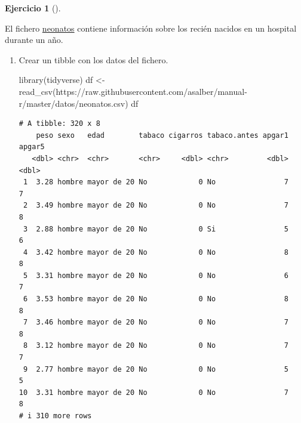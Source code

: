 \documentclass[
  spanish,
  a4paper,
]{scrreport}
\newenvironment{Shaded}{\begin{snugshade}}{\end{snugshade}}
\newcommand{\FunctionTok}[1]{\textcolor[rgb]{0.28,0.35,0.67}{#1}}
\newcommand{\NormalTok}[1]{\textcolor[rgb]{0.00,0.23,0.31}{#1}}
\newcommand{\OtherTok}[1]{\textcolor[rgb]{0.00,0.23,0.31}{#1}}
\newcommand{\StringTok}[1]{\textcolor[rgb]{0.13,0.47,0.30}{#1}}
\theoremstyle{definition}
\newtheorem{exercise}{Ejercicio}[chapter]
\theoremstyle{definition}
\theoremstyle{remark}
\begin{document}
\begin{exercise}[]\protect\hypertarget{exr-graficos-1}{}\label{exr-graficos-1}

El fichero
\href{https://raw.githubusercontent.com/asalber/manual-r/master/datos/neonatos.csv}{neonatos}
contiene información sobre los recién nacidos en un hospital durante un
año.

\begin{enumerate}
\def\labelenumi{\alph{enumi}.}
\item
  Crear un tibble con los datos del fichero.

  \begin{tcolorbox}[enhanced jigsaw, arc=.35mm, bottomrule=.15mm, bottomtitle=1mm, breakable, colback=white, colbacktitle=quarto-callout-note-color!10!white, colframe=quarto-callout-note-color-frame, coltitle=black, left=2mm, leftrule=.75mm, opacityback=0, opacitybacktitle=0.6, rightrule=.15mm, title=\textcolor{quarto-callout-note-color}{\faInfo}\hspace{0.5em}{Solución}, titlerule=0mm, toprule=.15mm, toptitle=1mm]

\begin{Shaded}
\begin{Highlighting}[]
\FunctionTok{library}\NormalTok{(tidyverse)}
\NormalTok{df }\OtherTok{\textless{}{-}} \FunctionTok{read\_csv}\NormalTok{(}\StringTok{\textquotesingle{}https://raw.githubusercontent.com/asalber/manual{-}r/master/datos/neonatos.csv\textquotesingle{}}\NormalTok{)}
\NormalTok{df}
\end{Highlighting}
\end{Shaded}

\begin{verbatim}
# A tibble: 320 x 8
    peso sexo   edad        tabaco cigarros tabaco.antes apgar1 apgar5
   <dbl> <chr>  <chr>       <chr>     <dbl> <chr>         <dbl>  <dbl>
 1  3.28 hombre mayor de 20 No            0 No                7      7
 2  3.49 hombre mayor de 20 No            0 No                7      8
 3  2.88 hombre mayor de 20 No            0 Si                5      6
 4  3.42 hombre mayor de 20 No            0 No                8      8
 5  3.31 hombre mayor de 20 No            0 No                6      7
 6  3.53 hombre mayor de 20 No            0 No                8      8
 7  3.46 hombre mayor de 20 No            0 No                7      8
 8  3.12 hombre mayor de 20 No            0 No                7      7
 9  2.77 hombre mayor de 20 No            0 No                5      5
10  3.31 hombre mayor de 20 No            0 No                7      8
# i 310 more rows
\end{verbatim}


\end{tcolorbox}
\end{enumerate}
\end{exercise}
\end{document}
